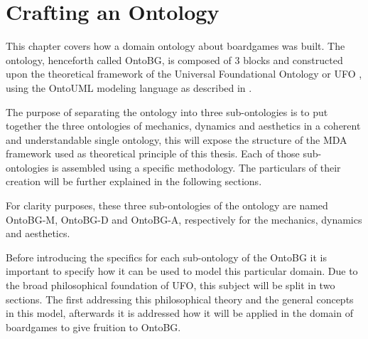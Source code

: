 \chapter{Crafting an Ontology}

This chapter covers how a domain ontology about boardgames was built. The ontology, henceforth called OntoBG, is composed of 3 blocks and constructed upon the theoretical framework of the Universal Foundational Ontology or UFO \citep{guizzardi_ontological_2005}, using the OntoUML modeling language as described in \cite{guizzardi_ontological_2005,guizzardi_ontoUML_2004,guizzardi2015towards}. 

The purpose of separating the ontology into three sub-ontologies is to put together the three ontologies of mechanics, dynamics and aesthetics in a coherent and understandable single ontology, this will expose the structure of the MDA framework used as theoretical principle of this thesis. Each of those sub-ontologies is assembled using a specific methodology. The particulars of their creation will be further explained in the following sections.

For clarity purposes, these three sub-ontologies of the ontology are named OntoBG-M, OntoBG-D and OntoBG-A, respectively for the mechanics, dynamics and aesthetics.

Before introducing the specifics for each sub-ontology of the OntoBG it is important to specify how it can be used to model this particular domain. Due to the broad philosophical foundation of UFO, this subject will be split in two sections. The first addressing this philosophical theory and the general concepts in this model, afterwards it is addressed how it will be applied in the domain of boardgames to give fruition to OntoBG.












